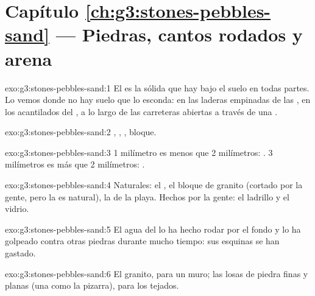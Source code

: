 \section*{Capítulo \ref{ch:g3:stones-pebbles-sand} --- Piedras, cantos rodados y arena}

\begin{solution}{exo:g3:stones-pebbles-sand:1}
El  es la  sólida que hay bajo el suelo en todas partes. Lo
vemos donde no hay suelo que lo esconda: en las laderas empinadas de las
, en los acantilados del , a lo largo de las carreteras abiertas
a través de una .
\end{solution}

\begin{solution}{exo:g3:stones-pebbles-sand:2}
, , , bloque.
\end{solution}

\begin{solution}{exo:g3:stones-pebbles-sand:3}
1 milímetro es menos que 2 milímetros: . 3 milímetros es más que
2 milímetros: .
\end{solution}

\begin{solution}{exo:g3:stones-pebbles-sand:4}
Naturales: el , el bloque de granito (cortado por la gente, pero
la  es natural), la  de la playa. Hechos por la gente: el ladrillo
y el vidrio.
\end{solution}

\begin{solution}{exo:g3:stones-pebbles-sand:5}
El agua del  lo ha hecho rodar por el fondo y lo ha golpeado contra
otras piedras durante mucho tiempo: sus esquinas se han gastado.
\end{solution}

\begin{solution}{exo:g3:stones-pebbles-sand:6}
El granito, para un muro; las losas de piedra finas y planas (una  como
la pizarra), para los tejados.
\end{solution}

